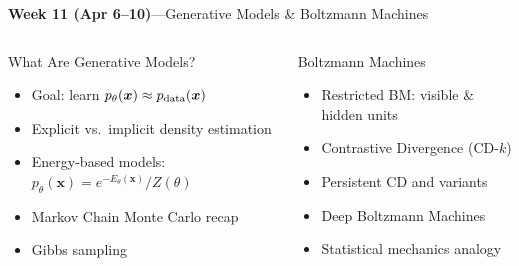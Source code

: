 \documentclass[aspectratio=169,11pt]{beamer}
\begin{document}
\begin{frame}{{\color{mlgold}\textbf{Week 11 (Apr 6--10)}\;---\;Generative Models \& Boltzmann Machines}}
  \begin{columns}[T]
      \begin{block}{What Are Generative Models?}
        \begin{itemize}\itemsep1pt
          \item Goal: learn $p_\theta(\bm{x})\approx p_{\rm data}(\bm{x})$
          \item Explicit vs.\ implicit density estimation
          \item Energy-based models:
                $p_\theta(\bm{x}) = e^{-E_\theta(\bm{x})}/Z(\theta)$
          \item Markov Chain Monte Carlo recap
          \item Gibbs sampling
        \end{itemize}
      \end{block}
      \begin{block}{Boltzmann Machines}
        \begin{itemize}\itemsep1pt
          \item Restricted BM: visible \& hidden units
          \item Contrastive Divergence (CD-$k$)
          \item Persistent CD and variants
          \item Deep Boltzmann Machines
          \item Statistical mechanics analogy
        \end{itemize}
      \end{block}
  \end{columns}
\end{frame}
\end{document}
